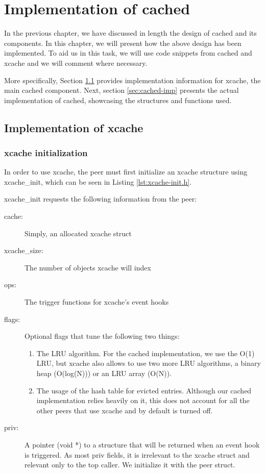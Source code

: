 \chapter{Implementation of cached}\label{ch:cached-implementation}

In the previous chapter, we have discussed in length the design of cached and 
its components. In this chapter, we will present how the above design has been
implemented. To aid us in this task, we will use code snippets from cached and 
xcache and we will comment where necessary.

More specifically, Section \ref{sec:xcache-imp} provides implementation 
information for xcache, the main cached component. Next, section 
\ref{sec:cached-imp} presents the actual implementation of cached, showcasing 
the structures and functions used.

\section{Implementation of xcache}\label{sec:xcache-imp}

\subsection{xcache initialization}

In order to use xcache, the peer must first initialize an xcache structure 
using xcache\_init, which can be seen in Listing \ref{lst:xcache-init.h}.


xcache\_init requests the following information from the peer:

\begin{description}
	\item[cache:] Simply, an allocated xcache struct
	\item[xcache\_size:] The number of objects xcache will index
	\item[ops:] The trigger functions for xcache's event hooks
	\item[flags:] Optional flags that tune the following two things:
		\begin{enumerate}
			\item The LRU algorithm. For the cached implementation, 
				we use the O(1) LRU, but xcache also allows to 
				use two more LRU algorithms, a binary heap 
				(O(log(N))) or an LRU array (O(N)).
			\item The usage of the hash table for evicted entries.  
				Although our cached implementation relies 
				heavily on it, this does not account for all 
				the other peers that use xcache and by default 
				is turned off.
		\end{enumerate}
	\item[priv:] A pointer (void *) to a structure that will be returned when 
		an event hook is triggered. As most priv fields, it is irrelevant to 
		the xcache struct and relevant only to the top caller. We 
		initialize it with the peer struct.
\end{description}

